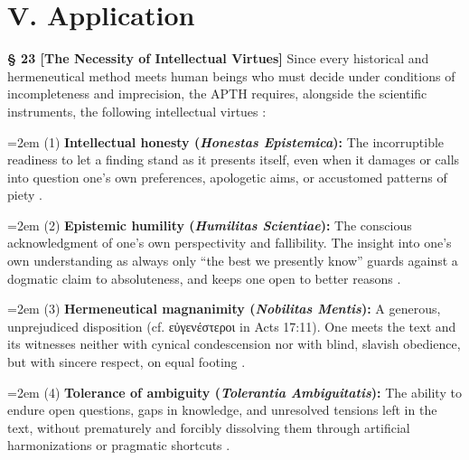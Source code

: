\documentclass[11pt,a4paper]{article}
\makeatletter
\newcommand{\apth}{{\apthfont APTH}\hspace{0.15em}\xspace}
\newcommand{\subpar}[1]{%
  \begingroup
  \leftskip=2em %
  \noindent#1\par
  \endgroup
}
\newcommand{\apthsec}[3]{%
  \phantomsection%
  \def\@currentlabel{#1}%
  \label{sec:#3}%
  \textbf{§ #1 [#2]}%
}
\makeatother
\begin{document}
\section*{V. Application}

\apthsec{23}{The Necessity of Intellectual Virtues}{tugenden} Since every historical and hermeneutical method meets human beings who must decide under conditions of incompleteness and imprecision, the \apth requires, alongside the scientific instruments, the following intellectual virtues \citep{zagzebski1996}:

\subpar{(1) \textbf{Intellectual honesty (\textit{Honestas Epistemica}):} The incorruptible readiness to let a finding stand as it presents itself, even when it damages or calls into question one's own preferences, apologetic aims, or accustomed patterns of piety \citep{williams2002}.}

\subpar{(2) \textbf{Epistemic humility (\textit{Humilitas Scientiae}):} The conscious acknowledgment of one's own perspectivity and fallibility. The insight into one's own understanding as always only ``the best we presently know'' guards against a dogmatic claim to absoluteness, and keeps one open to better reasons \citep{popper1963}.}

\subpar{(3) \textbf{Hermeneutical magnanimity (\textit{Nobilitas Mentis}):} A generous, unprejudiced disposition (cf. εὐγενέστεροι in Acts 17:11). One meets the text and its witnesses neither with cynical condescension nor with blind, slavish obedience, but with sincere respect, on equal footing \citep{davidson1974,jacobs2001}.}

\subpar{(4) \textbf{Tolerance of ambiguity (\textit{Tolerantia Ambiguitatis}):} The ability to endure open questions, gaps in knowledge, and unresolved tensions left in the text, without prematurely and forcibly dissolving them through artificial harmonizations or pragmatic shortcuts \citep{frenkelbrunswik1949}.}
\end{document}
